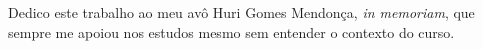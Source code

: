 \begin{dedicatoria}
Dedico este trabalho ao meu avô Huri Gomes Mendonça, \textit{in memoriam}, que sempre me apoiou nos estudos mesmo sem entender o contexto do curso.

\end{dedicatoria}
